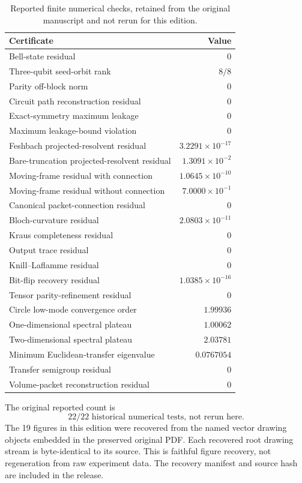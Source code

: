 \documentclass[11pt]{article}
\theoremstyle{definition}
\theoremstyle{remark}
\begin{document}
\begin{table}[htbp]
\centering
\caption{Reported finite numerical checks, retained from the original manuscript and not rerun for this edition.}
\label{tab:certificates}
\begin{tabular}{L{0.64\textwidth}r}
\toprule
Certificate & Value\\
\midrule
Bell-state residual & $0$\\
Three-qubit seed-orbit rank & $8/8$\\
Parity off-block norm & $0$\\
Circuit path reconstruction residual & $0$\\
Exact-symmetry maximum leakage & $0$\\
Maximum leakage-bound violation & $0$\\
Feshbach projected-resolvent residual & $3.2291\times10^{-17}$\\
Bare-truncation projected-resolvent residual & $1.3091\times10^{-2}$\\
Moving-frame residual with connection & $1.0645\times10^{-10}$\\
Moving-frame residual without connection & $7.0000\times10^{-1}$\\
Canonical packet-connection residual & $0$\\
Bloch-curvature residual & $2.0803\times10^{-11}$\\
Kraus completeness residual & $0$\\
Output trace residual & $0$\\
Knill--Laflamme residual & $0$\\
Bit-flip recovery residual & $1.0385\times10^{-16}$\\
Tensor parity-refinement residual & $0$\\
Circle low-mode convergence order & $1.99936$\\
One-dimensional spectral plateau & $1.00062$\\
Two-dimensional spectral plateau & $2.03781$\\
Minimum Euclidean-transfer eigenvalue & $0.0767054$\\
Transfer semigroup residual & $0$\\
Volume-packet reconstruction residual & $0$\\
\bottomrule
\end{tabular}
\end{table}

The original reported count is
\[
\boxed{22/22\text{ historical numerical tests, not rerun here}.}
\]
The 19 figures in this edition were recovered from the named vector drawing objects embedded in the preserved original PDF. Each recovered root drawing stream is byte-identical to its source. This is faithful figure recovery, not regeneration from raw experiment data. The recovery manifest and source hash are included in the release.
\end{document}
